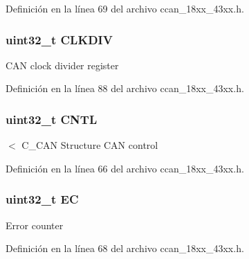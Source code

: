Definición en la línea 69 del archivo ccan\+\_\+18xx\+\_\+43xx.\+h.

\subsubsection[{\texorpdfstring{C\+L\+K\+D\+IV}{CLKDIV}}]{ uint32\+\_\+t C\+L\+K\+D\+IV}\hypertarget{struct_l_p_c___c_c_a_n___t_a2a33dba1349d1ebe45133cb2789a5307}{}\label{struct_l_p_c___c_c_a_n___t_a2a33dba1349d1ebe45133cb2789a5307}
C\+AN clock divider register 

Definición en la línea 88 del archivo ccan\+\_\+18xx\+\_\+43xx.\+h.

\subsubsection[{\texorpdfstring{C\+N\+TL}{CNTL}}]{ uint32\+\_\+t C\+N\+TL}\hypertarget{struct_l_p_c___c_c_a_n___t_aaea1cf878c3e7ab37309e673eb50101b}{}\label{struct_l_p_c___c_c_a_n___t_aaea1cf878c3e7ab37309e673eb50101b}
$<$ C\+\_\+\+C\+AN Structure C\+AN control 

Definición en la línea 66 del archivo ccan\+\_\+18xx\+\_\+43xx.\+h.

\subsubsection[{\texorpdfstring{EC}{EC}}]{ uint32\+\_\+t EC}\hypertarget{struct_l_p_c___c_c_a_n___t_ae9c79ec17ace363c54ee59581274ede5}{}\label{struct_l_p_c___c_c_a_n___t_ae9c79ec17ace363c54ee59581274ede5}
Error counter 

Definición en la línea 68 del archivo ccan\+\_\+18xx\+\_\+43xx.\+h.

